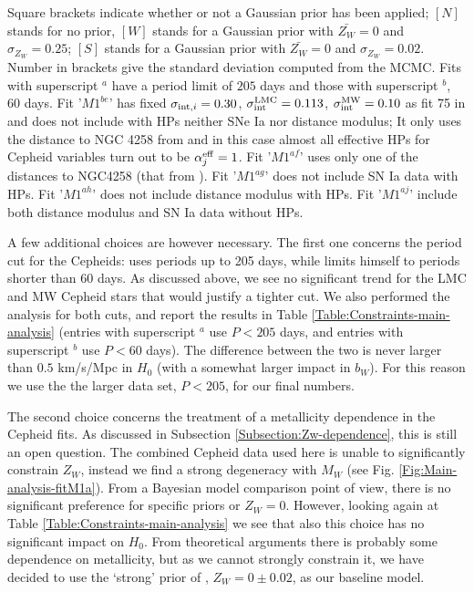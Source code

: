 \begin{table}[tbp]
\caption{\label{Table:Constraints-main-analysis} Square brackets indicate whether or not a Gaussian prior has been applied; $[N]$ stands for no prior, $[W]$ stands for a Gaussian prior with $\bar{Z_W}=0$ and $\sigma_{Z_W}=0.25$;  $[S]$ stands for a Gaussian prior with $\bar{Z_W}=0$ and $\sigma_{Z_W}=0.02$. Number in brackets give the standard deviation computed from the MCMC. Fits with superscript $^a$ have a period limit of $205$ days and those with superscript $^b$, $60$ days. Fit '$M1^{be}$' has fixed $\sigma_{\mathrm{int},i}=0.30$, $\sigma_{\mathrm{int}}^{\mathrm{LMC}}=0.113$, $\sigma_{\mathrm{int}}^{\mathrm{MW}}=0.10$ as fit 75 in \cite{Efstathiou:2013via} and does not include with HPs neither SNe Ia nor distance modulus; It only uses the distance to NGC 4258 from \cite{Humphreys:2013eja} and in this case almost all effective HPs for Cepheid variables turn out to be $\alpha_j^{\mathrm{eff}}=1$. Fit '$M1^{af}$' uses only one of the distances to NGC4258 (that from \cite{Humphreys:2013eja}). Fit '$M1^{ag}$' does not include SN Ia data with HPs. Fit '$M1^{ah}$' does not include distance modulus with HPs. Fit '$M1^{aj}$' include both distance modulus and SN Ia data without HPs.}
\end{table}

 A few additional choices are however necessary. The first one concerns the period cut for the Cepheids: \cite{Riess:2011yx} uses periods up to 
205 days, while  \cite{Efstathiou:2013via} limits himself to periods shorter than 60 days. As discussed above, we see no significant trend for the LMC and MW Cepheid stars that would justify a tighter cut. We also performed the analysis for both cuts, and report the results in Table \ref{Table:Constraints-main-analysis} (entries with superscript $^{a}$ use $P<205$ days, and entries with superscript $^{b}$ use $P<60$ days). The difference between the two is never larger than $0.5$ km/s/Mpc in $H_0$ (with a somewhat larger impact in $b_W$). For this reason we use the the larger data set, $P<205$, for our
final numbers.

The second choice concerns the treatment of a metallicity dependence in the Cepheid fits. As discussed in Subsection \ref{Subsection:Zw-dependence}, this is still an open question. The combined Cepheid data used here is unable to significantly constrain $Z_W$, instead we find a strong degeneracy with $M_W$ (see Fig. \ref{Fig:Main-analysis-fitM1a}). From a Bayesian model comparison point of view, there is no significant preference for specific priors or $Z_W=0$. However, looking again at Table \ref{Table:Constraints-main-analysis} we see that also this choice has no significant impact on $H_0$. From theoretical
arguments there is probably some dependence on metallicity, but as we cannot strongly constrain it, we have decided to use the `strong' prior of \cite{Efstathiou:2013via}, $Z_W = 0 \pm 0.02$, as our baseline model.

